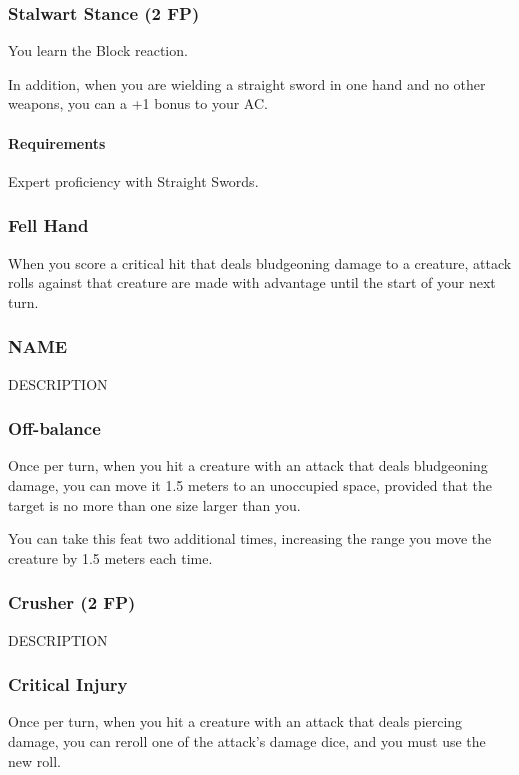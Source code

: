 \subsubsection{Stalwart Stance (2 FP)} \label{feat::stalwartstance}
    You learn the Block reaction.

    In addition, when you are wielding a straight sword in one hand and no other weapons, you can a +1 bonus to your AC.
    \paragraph{Requirements} Expert proficiency with Straight Swords.

\subsubsection{Fell Hand} \label{feat::fellhand}
    When you score a critical hit that deals bludgeoning damage to a creature, attack rolls against that creature are made with advantage until the start of your next turn.
\subsubsection{NAME} \label{feat::name}
    DESCRIPTION
\subsubsection{Off-balance} \label{feat::offbalance}
    Once per turn, when you hit a creature with an attack that deals bludgeoning damage, you can move it 1.5 meters to an unoccupied space, provided that the target is no more than one size larger than you.

    You can take this feat two additional times, increasing the range you move the creature by 1.5 meters each time.
\subsubsection{Crusher (2 FP)} \label{feat::crusher}
    DESCRIPTION
\subsubsection{Critical Injury} \label{feat::criticalinjury}
    Once per turn, when you hit a creature with an attack that deals piercing damage, you can reroll one of the attack's damage dice, and you must use the new roll.
